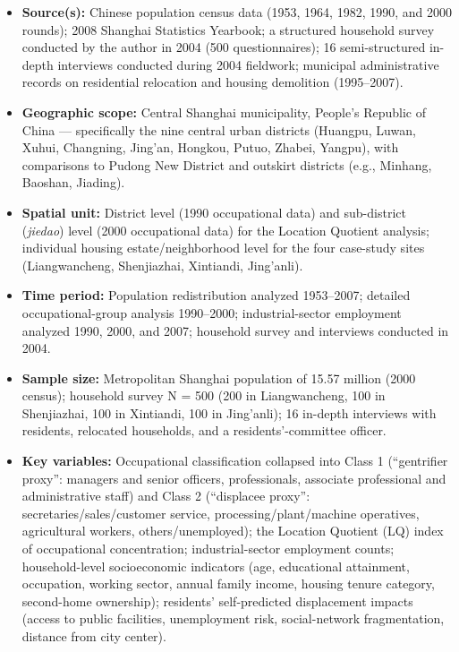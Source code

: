 \begin{itemize}
  \item \textbf{Source(s):} Chinese population census data (1953, 1964, 1982, 1990, and 2000 rounds); 2008 Shanghai Statistics Yearbook; a structured household survey conducted by the author in 2004 (500 questionnaires); 16 semi-structured in-depth interviews conducted during 2004 fieldwork; municipal administrative records on residential relocation and housing demolition (1995--2007).
  \item \textbf{Geographic scope:} Central Shanghai municipality, People's Republic of China --- specifically the nine central urban districts (Huangpu, Luwan, Xuhui, Changning, Jing'an, Hongkou, Putuo, Zhabei, Yangpu), with comparisons to Pudong New District and outskirt districts (e.g., Minhang, Baoshan, Jiading).
  \item \textbf{Spatial unit:} District level (1990 occupational data) and sub-district (\emph{jiedao}) level (2000 occupational data) for the Location Quotient analysis; individual housing estate/neighborhood level for the four case-study sites (Liangwancheng, Shenjiazhai, Xintiandi, Jing'anli).
  \item \textbf{Time period:} Population redistribution analyzed 1953--2007; detailed occupational-group analysis 1990--2000; industrial-sector employment analyzed 1990, 2000, and 2007; household survey and interviews conducted in 2004.
  \item \textbf{Sample size:} Metropolitan Shanghai population of 15.57 million (2000 census); household survey N = 500 (200 in Liangwancheng, 100 in Shenjiazhai, 100 in Xintiandi, 100 in Jing'anli); 16 in-depth interviews with residents, relocated households, and a residents'-committee officer.
  \item \textbf{Key variables:} Occupational classification collapsed into Class 1 (``gentrifier proxy'': managers and senior officers, professionals, associate professional and administrative staff) and Class 2 (``displacee proxy'': secretaries/sales/customer service, processing/plant/machine operatives, agricultural workers, others/unemployed); the Location Quotient (LQ) index of occupational concentration; industrial-sector employment counts; household-level socioeconomic indicators (age, educational attainment, occupation, working sector, annual family income, housing tenure category, second-home ownership); residents' self-predicted displacement impacts (access to public facilities, unemployment risk, social-network fragmentation, distance from city center).

\end{itemize}
